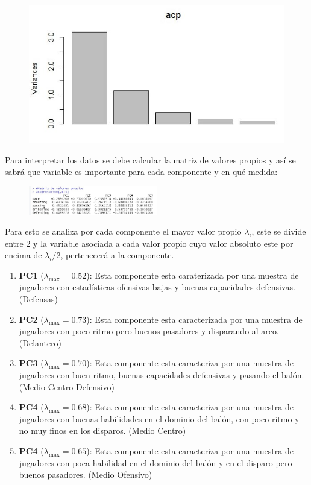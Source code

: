 \documentclass[a4paper,10pt,twocolumn]{article}
\begin{document}
\begin{figure}[h]
	\includegraphics[scale=0.55]{./imgs/acp_plot.jpg}
\end{figure}

Para interpretar los datos se debe calcular la matriz de valores propios y así se sabrá que variable es importante para cada componente y en qué medida:

\begin{figure}[h]
	\includegraphics[width=0.5\textwidth]{./imgs/acp_vp.jpg}
\end{figure}


Para esto se analiza por cada componente el mayor valor propio $\lambda_i$, este se divide entre 2 y la variable asociada a cada valor propio cuyo valor absoluto este por encima de $\lambda_i / 2$, pertenecerá a la componente.

\begin{enumerate}
	\item[] \textbf{PC1} ($\lambda_{\max} = 0.52$): Esta componente esta caraterizada por una muestra de jugadores con estadísticas ofensivas bajas y buenas capacidades defensivas. (Defensas)
	
	\item[] \textbf{PC2} ($\lambda_{\max} = 0.73$): Esta componente esta caracterizada por una muestra de jugadores con poco ritmo pero buenos pasadores y disparando al arco. (Delantero)
	
	\item[] \textbf{PC3} ($\lambda_{\max} = 0.70$): Esta componente esta caracteriza por una muestra de	jugadores con buen ritmo, buenas capacidades defensivas y pasando el balón. (Medio Centro Defensivo) 
	
	\item[] \textbf{PC4} ($\lambda_{\max} = 0.68$): Esta componente esta caracteriza por una muestra de	jugadores con buenas habilidades en el dominio del balón, con poco ritmo y no muy finos en los disparos. (Medio Centro)
	
	\item[] \textbf{PC4} ($\lambda_{\max} = 0.65$): Esta componente esta caracteriza por una muestra de	jugadores con poca habilidad en el dominio del balón y en el disparo pero buenos pasadores. (Medio Ofensivo) 
	
\end{enumerate} 
\end{document}
